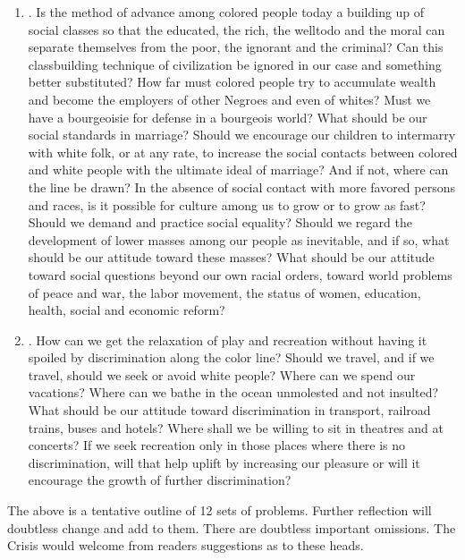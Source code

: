 \documentclass[letterpaper,10pt,english]{jupyterBook}
\begin{document}
\begin{enumerate}
\item {} 
\sphinxAtStartPar
{}. Is the method of advance among colored people today a building up of social classes so that the educated, the rich, the well\sphinxhyphen{}to\sphinxhyphen{}do and the moral can separate themselves from the poor, the ignorant and the criminal? Can this class\sphinxhyphen{}building technique of civilization be ignored in our case and something better substituted? How far must colored people try to accumulate wealth and become the employers of other Negroes and even of whites? Must we have a bourgeoisie for defense in a bourgeois world? What should be our social standards in marriage? Should we encourage our children to inter\sphinxhyphen{}marry with white folk, or at any rate, to increase the social contacts between colored and white people with the ultimate ideal of marriage? And if not, where can the line be drawn? In the absence of social contact with more favored persons and races, is it possible for culture among us to grow or to grow as fast? Should we demand and practice social equality? Should we regard the development of lower masses among our people as inevitable, and if so, what should be our attitude toward these masses? What should be our attitude toward social questions beyond our own racial orders, toward world problems of peace and war, the labor movement, the status of women, education, health, social and economic reform?

\item {} 
\sphinxAtStartPar
{}. How can we get the relaxation of play and recreation without having it spoiled by discrimination along the color line? Should we travel, and if we travel, should we seek or avoid white people? Where can we spend our vacations? Where can we bathe in the ocean unmolested and not insulted? What should be our attitude toward discrimination in transport, railroad trains, buses and hotels? Where shall we be willing to sit in theatres and at concerts? If we seek recreation only in those places where there is no discrimination, will that help uplift by increasing our pleasure or will it encourage the growth of further discrimination?

\end{enumerate}

\sphinxAtStartPar
The above is a tentative outline of 12 sets of problems. Further reflection will doubtless change and add to them. There are doubtless important omissions. The Crisis would welcome from readers suggestions as to these heads.
\end{document}
